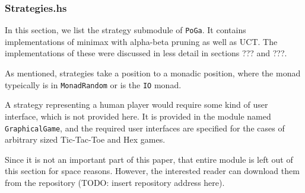 \subsubsection {Strategies.hs}

In this section, we list the strategy submodule of \texttt{PoGa}.
It contains implementations of minimax with alpha-beta pruning as well as UCT.
The implementations of these were discussed in less detail in sections ??? and ???.


As mentioned, strategies take a position to a monadic position, where the monad typeically is in \texttt{MonadRandom} or is the \texttt{IO} monad.

A strategy representing a human player would require some kind of user interface, which is not provided here.
It is provided in the module named \texttt{GraphicalGame}, and the required user interfaces are specified for the cases of arbitrary sized Tic-Tac-Toe and Hex games.

Since it is not an important part of this paper, that entire module is left out of this section for space reasons.
However, the interested reader can download them from the repository (TODO: insert repository address here).




